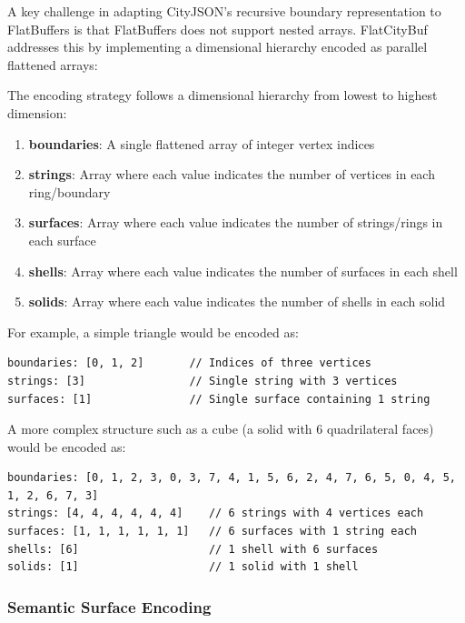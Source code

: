 A key challenge in adapting CityJSON's recursive boundary representation to FlatBuffers is that FlatBuffers does not support nested arrays. FlatCityBuf addresses this by implementing a dimensional hierarchy encoded as parallel flattened arrays:

The encoding strategy follows a dimensional hierarchy from lowest to highest dimension:

\begin{enumerate}
  \item \textbf{boundaries}: A single flattened array of integer vertex indices
  \item \textbf{strings}: Array where each value indicates the number of vertices in each ring/boundary
  \item \textbf{surfaces}: Array where each value indicates the number of strings/rings in each surface
  \item \textbf{shells}: Array where each value indicates the number of surfaces in each shell
  \item \textbf{solids}: Array where each value indicates the number of shells in each solid
\end{enumerate}

For example, a simple triangle would be encoded as:

\begin{verbatim}
boundaries: [0, 1, 2]       // Indices of three vertices
strings: [3]                // Single string with 3 vertices
surfaces: [1]               // Single surface containing 1 string
\end{verbatim}

A more complex structure such as a cube (a solid with 6 quadrilateral faces) would be encoded as:

\begin{verbatim}
boundaries: [0, 1, 2, 3, 0, 3, 7, 4, 1, 5, 6, 2, 4, 7, 6, 5, 0, 4, 5, 1, 2, 6, 7, 3]
strings: [4, 4, 4, 4, 4, 4]    // 6 strings with 4 vertices each
surfaces: [1, 1, 1, 1, 1, 1]   // 6 surfaces with 1 string each
shells: [6]                    // 1 shell with 6 surfaces
solids: [1]                    // 1 solid with 1 shell
\end{verbatim}

\subsubsection{Semantic Surface Encoding}
\label{methodology:feature_encoding:geometry_encoding:semantics}


